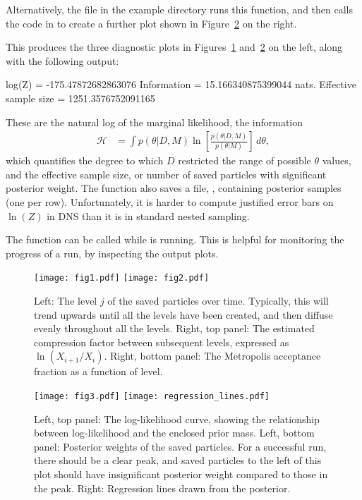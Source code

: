 \documentclass[article]{jss}
\begin{document}
Alternatively, the file
 in the example directory runs this function, and then
calls the code in  to create a further plot shown in
Figure~\ref{fig:fig3} on the right.

%
This produces the three diagnostic plots in Figures~\ref{fig:fig1}
and~\ref{fig:fig3} on the left, along with the following output:
%
\begin{CodeChunk}
\begin{CodeOutput}
log(Z) = -175.47872682863076
Information = 15.166340875399044 nats.
Effective sample size = 1251.3576752091165
\end{CodeOutput}
\end{CodeChunk}
%
These are the natural log of the marginal likelihood, the
information
\begin{align*}
\mathcal{H} &= \int p(\theta|D, M)
\ln\left[\frac{p(\theta | D, M)}{p(\theta | M)}\right] \, d\theta,
\end{align*}
which quantifies the degree to which $D$ restricted the
range of possible $\theta$ values,
and the effective sample size,
or number of saved particles with significant posterior weight.
The  function also saves a file,
, containing posterior samples (one per row).
Unfortunately, it is harder to compute justified error bars on $\ln(Z)$
in DNS than it is in standard nested sampling.

The  function can be called while  is running.
This is helpful for monitoring the progress of a run, by inspecting the
output plots.

\begin{figure}[t!]
\centering
\texttt{[image: fig1.pdf]}%
\texttt{[image: fig2.pdf]}
\caption{Left: The level $j$ of the saved particles over time.
Typically, this will trend upwards until all the levels have
been created, and then diffuse evenly throughout all the levels.
Right, top panel: The estimated compression factor between subsequent
levels, expressed as $\ln(X_{i+1}/X_{i})$. Right, bottom panel:
The Metropolis acceptance fraction as a function of level.
\label{fig:fig1}}
\end{figure}

\begin{figure}[t!]
  \centering
\texttt{[image: fig3.pdf]}
\texttt{[image: regression\_lines.pdf]}
\caption{Left, top panel: The log-likelihood curve, showing the relationship
between log-likelihood and the enclosed prior mass.
Left, bottom panel: Posterior weights of the saved particles.
For a successful run, there should be a clear peak, and saved particles
to the left of this plot should have insignificant posterior weight compared
to those in the peak.
Right: Regression lines drawn from the posterior.
\label{fig:fig3}}
\end{figure}
\end{document}
